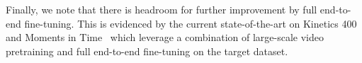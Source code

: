 Finally, we note that there is headroom for further improvement by full end-to-end fine-tuning. This is evidenced by the current state-of-the-art on Kinetics 400~\citep{wang2022internvideo} and Moments in Time~\citep{yu2022coca} which leverage a combination of large-scale video pretraining and full end-to-end fine-tuning on the target dataset. 


